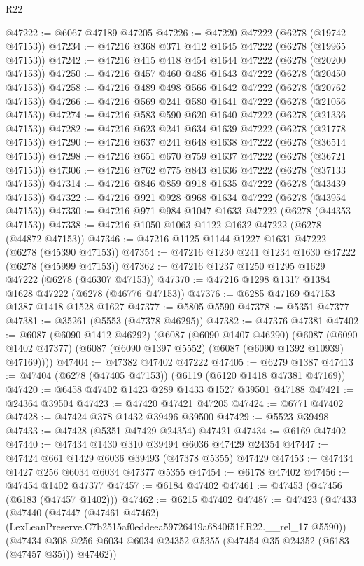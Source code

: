 \begin{lexlean}{R22}
\begin{coremodule}
@47222 := @6067 @47189 @47205
@47226 := @47220 @47222 (@6278 (@19742 @47153))
@47234 := @47216 @368 @371 @412 @1645 @47222 (@6278 (@19965 @47153))
@47242 := @47216 @415 @418 @454 @1644 @47222 (@6278 (@20200 @47153))
@47250 := @47216 @457 @460 @486 @1643 @47222 (@6278 (@20450 @47153))
@47258 := @47216 @489 @498 @566 @1642 @47222 (@6278 (@20762 @47153))
@47266 := @47216 @569 @241 @580 @1641 @47222 (@6278 (@21056 @47153))
@47274 := @47216 @583 @590 @620 @1640 @47222 (@6278 (@21336 @47153))
@47282 := @47216 @623 @241 @634 @1639 @47222 (@6278 (@21778 @47153))
@47290 := @47216 @637 @241 @648 @1638 @47222 (@6278 (@36514 @47153))
@47298 := @47216 @651 @670 @759 @1637 @47222 (@6278 (@36721 @47153))
@47306 := @47216 @762 @775 @843 @1636 @47222 (@6278 (@37133 @47153))
@47314 := @47216 @846 @859 @918 @1635 @47222 (@6278 (@43439 @47153))
@47322 := @47216 @921 @928 @968 @1634 @47222 (@6278 (@43954 @47153))
@47330 := @47216 @971 @984 @1047 @1633 @47222 (@6278 (@44353 @47153))
@47338 := @47216 @1050 @1063 @1122 @1632 @47222 (@6278 (@44872 @47153))
@47346 := @47216 @1125 @1144 @1227 @1631 @47222 (@6278 (@45390 @47153))
@47354 := @47216 @1230 @241 @1234 @1630 @47222 (@6278 (@45999 @47153))
@47362 := @47216 @1237 @1250 @1295 @1629 @47222 (@6278 (@46307 @47153))
@47370 := @47216 @1298 @1317 @1384 @1628 @47222 (@6278 (@46776 @47153))
@47376 := @6285 @47169 @47153 @1387 @1418 @1528 @1627
@47377 := @5805 @5590
@47378 := @5351 @47377
@47381 := @35261 (@5553 (@47378 @46295))
@47382 := @47376 @47381
@47402 := @6087
    (@6090 @1412 @46292)
    (@6087
      (@6090 @1407 @46290)
      (@6087 (@6090 @1402 @47377) (@6087 (@6090 @1397 @5552) (@6087 (@6090 @1392 @10939) @47169))))
@47404 := @47382 @47402 @47222
@47405 := @6279 @1387
@47413 := @47404 (@6278 (@47405 @47153)) (@6119 (@6120 @1418 @47381 @47169))
@47420 := @6458 @47402 @1423 @289 @1433 @1527 @39501 @47188
@47421 := @24364 @39504
@47423 := @47420 @47421 @47205
@47424 := @6771 @47402
@47428 := @47424 @378 @1432 @39496 @39500
@47429 := @5523 @39498
@47433 := @47428 (@5351 @47429 @24354) @47421
@47434 := @6169 @47402
@47440 := @47434 @1430 @310 @39494 @6036 @47429 @24354
@47447 := @47424 @661 @1429 @6036 @39493 (@47378 @5355) @47429
@47453 := @47434 @1427 @256 @6034 @6034 @47377 @5355
@47454 := @6178 @47402
@47456 := @47454 @1402 @47377
@47457 := @6184 @47402
@47461 := @47453 (@47456 (@6183 (@47457 @1402)))
@47462 := @6215 @47402
@47487 := @47423
    (@47433
      (@47440
        (@47447
          (@47461 @47462)
          (LexLeanPreserve.C7b2515af0eddeea59726419a6840f51f.R22.__rel_17 @5590))
        (@47434 @308 @256 @6034 @6034 @24352 @5355 (@47454 @35 @24352 (@6183 (@47457 @35))) @47462))

\end{coremodule}
\end{lexlean}
